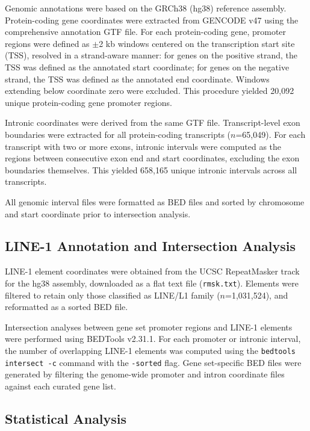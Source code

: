 \documentclass[preprints,briefreport,submit,pdftex,oneauthor]{Definitions/mdpi}
\begin{document}
Genomic annotations were based on the GRCh38 (hg38) reference
assembly. Protein-coding gene coordinates were extracted from
GENCODE v47\cite{frankish2023} using the comprehensive
annotation GTF file. For each protein-coding gene, promoter
regions were defined as $\pm$2 kb windows centered on the
transcription start site (TSS), resolved in a strand-aware
manner: for genes on the positive strand, the TSS was defined
as the annotated start coordinate; for genes on the negative
strand, the TSS was defined as the annotated end coordinate.
Windows extending below coordinate zero were excluded. This
procedure yielded 20,092 unique protein-coding gene promoter
regions.

Intronic coordinates were derived from the same GTF file.
Transcript-level exon boundaries were extracted for all
protein-coding transcripts ($n$=65,049). For each transcript
with two or more exons, intronic intervals were computed as
the regions between consecutive exon end and start coordinates,
excluding the exon boundaries themselves. This yielded 658,165
unique intronic intervals across all transcripts.

All genomic interval files were formatted as BED files and
sorted by chromosome and start coordinate prior to intersection
analysis.

\subsection{LINE-1 Annotation and Intersection Analysis}

LINE-1 element coordinates were obtained from the UCSC
RepeatMasker track for the hg38 assembly\cite{smit2015},
downloaded as a flat text file
(\texttt{rmsk.txt}). Elements were filtered to retain only
those classified as LINE/L1 family ($n$=1,031,524), and
reformatted as a sorted BED file.

Intersection analyses between gene set promoter regions and
LINE-1 elements were performed using BEDTools v2.31.1\cite{quinlan2010}.
For each promoter or intronic interval, the number of
overlapping LINE-1 elements was computed using the
\texttt{bedtools intersect -c} command with the \texttt{-sorted}
flag. Gene set-specific BED files were generated by filtering
the genome-wide promoter and intron coordinate files against
each curated gene list.

\subsection{Statistical Analysis}
\end{document}

